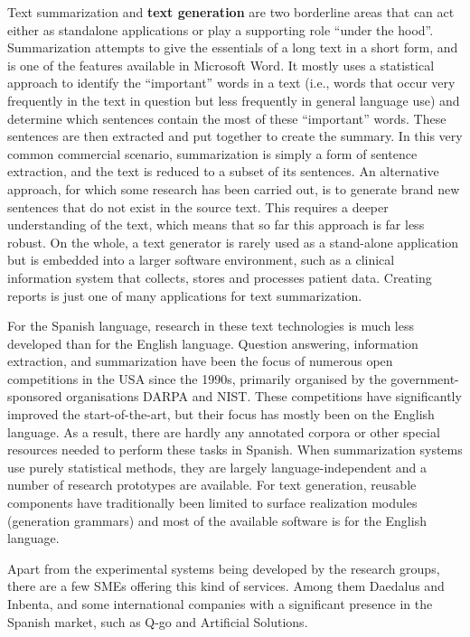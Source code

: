 \begin{multicols}{2}
Text summarization and \textbf{text generation} are two borderline areas that can act either as standalone applications or play a supporting role “under the hood”. Summarization attempts to give the essentials of a long text in a short form, and is one of the features available in Microsoft Word. It mostly uses a statistical approach to identify the “important” words in a text (i.e., words that occur very frequently in the text in question but less frequently in general language use) and determine which sentences contain the most of these “important” words. These sentences are then extracted and put together to create the summary. In this very common commercial scenario, summarization is simply a form of sentence extraction, and the text is reduced to a subset of its sentences. An alternative approach, for which some research has been carried out, is to generate brand new sentences that do not exist in the source text. This requires a deeper understanding of the text, which means that so far this approach is far less robust. On the whole, a text generator is rarely used as a stand-alone application but is embedded into a larger software environment, such as a clinical information system that collects, stores and processes patient data. Creating reports is just one of many applications for text summarization.


For the Spanish language, research in these text technologies is much less developed than for the English language. Question answering, information extraction, and summarization have been the focus of numerous open competitions in the USA since the 1990s, primarily organised by the government-sponsored organisations DARPA and NIST. These competitions have significantly improved the start-of-the-art, but their focus has mostly been on the English language. As a result, there are hardly any annotated corpora or other special resources needed to perform these tasks in Spanish. When summarization systems use purely statistical methods, they are largely language-independent and a number of research prototypes are available. For text generation, reusable components have traditionally been limited to surface realization modules (generation grammars) and most of the available software is for the English language.

Apart from the experimental systems being developed by the research groups, there are a few SMEs offering this kind of services. Among them Daedalus and Inbenta, and some international companies with a significant presence in the Spanish market, such as Q-go  and Artificial Solutions.


\end{multicols}
